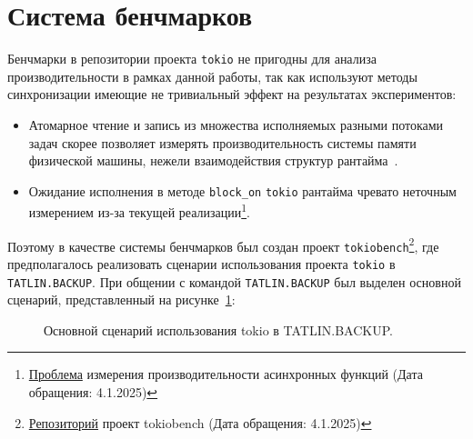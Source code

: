 
\section{Система бенчмарков}

Бенчмарки в репозитории проекта \verb|tokio| не пригодны для анализа производительности в рамках данной работы, так как используют методы синхронизации имеющие не тривиальный эффект на результатах экспериментов:

\begin{itemize}
    \item Атомарное чтение и запись из множества исполняемых разными потоками задач скорее позволяет измерять производительность системы памяти физической машины, нежели взаимодействия структур рантайма~\cite{atomicOnModerHardware}.
    \item Ожидание исполнения в методе \verb|block_on| \verb|tokio| рантайма чревато неточным измерением из-за текущей реализации\footnote{\href{https://github.com/bheisler/criterion.rs/issues/819}{Проблема} измерения производительности асинхронных функций (Дата обращения: 4.1.2025)}.
\end{itemize}

Поэтому в качестве системы бенчмарков был создан проект \verb|tokiobench|\footnote{\href{https://github.com/IgorErin/tokiobench}{Репозиторий} проект tokiobench (Дата обращения: 4.1.2025)}, где предполагалось реализовать сценарии использования проекта \verb|tokio| в \verb|TATLIN.BACKUP|. При общении с командой \verb|TATLIN.BACKUP| был выделен основной сценарий, представленный на рисунке~\ref{fig:scenario}:

\begin{figure}[H]
    \begin{center}
    \end{center}

    \caption{Основной сценарий использования tokio в TATLIN.BACKUP.}
    \label{fig:scenario}
\end{figure}

